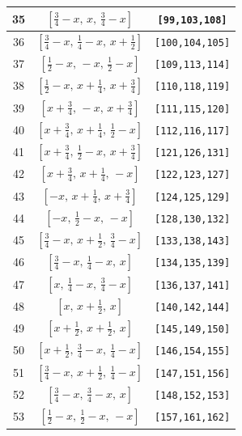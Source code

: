 \documentclass[fleqn,8pt]{jsarticle}
\begin{document}
\begin{longtable}{ccc}
35 & $\left[ \frac{3}{4} - x,\, x,\, \frac{3}{4} - x \right]$ & {\tt [99,103,108]} \\ \hline
36 & $\left[ \frac{3}{4} - x,\, \frac{1}{4} - x,\, x + \frac{1}{2} \right]$ & {\tt [100,104,105]} \\ \hline
37 & $\left[ \frac{1}{2} - x,\, - x,\, \frac{1}{2} - x \right]$ & {\tt [109,113,114]} \\ \hline
38 & $\left[ \frac{1}{2} - x,\, x + \frac{1}{4},\, x + \frac{3}{4} \right]$ & {\tt [110,118,119]} \\ \hline
39 & $\left[ x + \frac{3}{4},\, - x,\, x + \frac{3}{4} \right]$ & {\tt [111,115,120]} \\ \hline
40 & $\left[ x + \frac{3}{4},\, x + \frac{1}{4},\, \frac{1}{2} - x \right]$ & {\tt [112,116,117]} \\ \hline
41 & $\left[ x + \frac{3}{4},\, \frac{1}{2} - x,\, x + \frac{3}{4} \right]$ & {\tt [121,126,131]} \\ \hline
42 & $\left[ x + \frac{3}{4},\, x + \frac{1}{4},\, - x \right]$ & {\tt [122,123,127]} \\ \hline
43 & $\left[ - x,\, x + \frac{1}{4},\, x + \frac{3}{4} \right]$ & {\tt [124,125,129]} \\ \hline
44 & $\left[ - x,\, \frac{1}{2} - x,\, - x \right]$ & {\tt [128,130,132]} \\ \hline
45 & $\left[ \frac{3}{4} - x,\, x + \frac{1}{2},\, \frac{3}{4} - x \right]$ & {\tt [133,138,143]} \\ \hline
46 & $\left[ \frac{3}{4} - x,\, \frac{1}{4} - x,\, x \right]$ & {\tt [134,135,139]} \\ \hline
47 & $\left[ x,\, \frac{1}{4} - x,\, \frac{3}{4} - x \right]$ & {\tt [136,137,141]} \\ \hline
48 & $\left[ x,\, x + \frac{1}{2},\, x \right]$ & {\tt [140,142,144]} \\ \hline
49 & $\left[ x + \frac{1}{2},\, x + \frac{1}{2},\, x \right]$ & {\tt [145,149,150]} \\ \hline
50 & $\left[ x + \frac{1}{2},\, \frac{3}{4} - x,\, \frac{1}{4} - x \right]$ & {\tt [146,154,155]} \\ \hline
51 & $\left[ \frac{3}{4} - x,\, x + \frac{1}{2},\, \frac{1}{4} - x \right]$ & {\tt [147,151,156]} \\ \hline
52 & $\left[ \frac{3}{4} - x,\, \frac{3}{4} - x,\, x \right]$ & {\tt [148,152,153]} \\ \hline
53 & $\left[ \frac{1}{2} - x,\, \frac{1}{2} - x,\, - x \right]$ & {\tt [157,161,162]} \\ \hline

\end{longtable}
\end{document}
